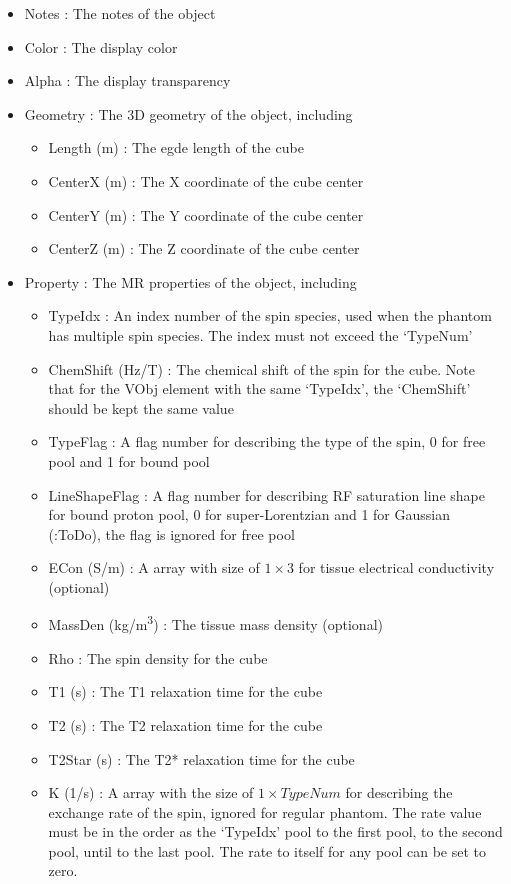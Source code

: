 \documentclass{book}%
\begin{document}
\begin{itemize}
	\item Notes : The notes of the object
	\item Color : The display color
	\item Alpha : The display transparency
	\item Geometry : The 3D geometry of the object, including
	\begin{itemize}
		\item Length (m) : The egde length of the cube
		\item CenterX (m) : The X coordinate of the cube center
		\item CenterY (m) : The Y coordinate of the cube center
		\item CenterZ (m) : The Z coordinate of the cube center
	\end{itemize}
	\item Property : The MR properties of the object, including
	\begin{itemize}
		\item TypeIdx : An index number of the spin species, used when the phantom has multiple spin species. The index must not exceed the `TypeNum'
		\item ChemShift (Hz/T) : The chemical shift of the spin for the cube. Note that for the VObj element with the same `TypeIdx', the `ChemShift' should be kept the same value
		\item TypeFlag : A flag number for describing the type of the spin, 0 for free pool and 1 for bound pool
		\item LineShapeFlag : A flag number for describing RF saturation line shape for bound proton pool, 0 for super-Lorentzian and 1 for Gaussian (:ToDo), the flag is ignored for free pool
		\item ECon (S/m) : A array with size of $1 \times 3 $ for tissue electrical conductivity (optional)
		\item MassDen (kg/m\textsuperscript{3}) : The tissue mass density (optional)
		\item Rho : The spin density for the cube
		\item T1 (s) : The T1 relaxation time for the cube
		\item T2 (s) : The T2 relaxation time for the cube
		\item T2Star (s) : The T2* relaxation time for the cube
		\item K (1/s) : A array with the size of $1 \times TypeNum$ for describing the exchange rate of the spin, ignored for regular phantom. The rate value must be in the order as the `TypeIdx' pool to the first pool, to the second pool, until to the last pool. The rate to itself for any pool can be set to zero.
	\end{itemize}
\end{itemize}
\end{document}
